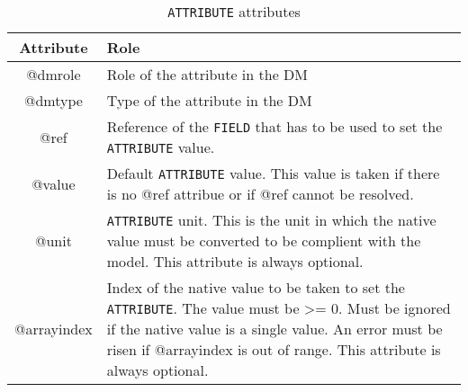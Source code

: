 \begin{table}[!htbp]
\small
\centering
\begin{tabulary}{\linewidth}{|c|J|}       
       \hline 
            \textbf{Attribute} & 
            \textbf {Role}\\
       \hline         \hline  
            @dmrole & 
            Role of the attribute in the DM\\
        \hline 
            @dmtype & 
            Type of the attribute in the DM\\
        \hline 
            @ref & 
            Reference of the \texttt{FIELD} that has to be used to set the 
            \texttt{ATTRIBUTE} value.\\
        \hline 
            @value& 
            Default \texttt{ATTRIBUTE} value. This value is taken if there is no 
            @ref attribue or if @ref cannot be resolved.\\
        \hline 
            @unit & 
            \texttt{ATTRIBUTE} unit. This is the unit in which the native value must be 
            converted to be complient with the model. This attribute is always optional.\\
        \hline 
            @arrayindex & 
            Index of the native value to be taken to set the \texttt{ATTRIBUTE}. 
            The value must be >= 0.
            Must be ignored if the native value is a single value. 
            An error must be risen if @arrayindex is out of range.
            This attribute is always optional.\\
        \hline 
     \end{tabulary}
     \caption{\texttt{ATTRIBUTE} attributes} 
     \label{tbl:attribute-att}
 \end{table}

